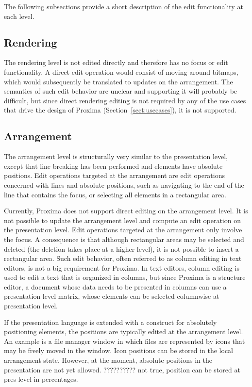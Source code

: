 The following subsections provide a short description of the edit functionality at each level. 
 
 
%																
\subsection{Rendering}

The rendering level is not edited directly and therefore has no focus or edit functionality. A direct edit operation would consist of moving around bitmaps, which would subsequently be translated to updates on the arrangement. The semantics of such edit behavior are unclear and supporting it will probably be difficult, but since direct rendering editing is not required by any of the use cases that drive the design of Proxima (Section~\ref{sect:usecases}), it is not supported.
  

%																
\subsection{Arrangement}\label{sect:editArr} 

The arrangement level is structurally very similar to the presentation level, except that line breaking has been performed and elements have absolute positions. Edit operations targeted at the arrangement are edit operations concerned with lines and absolute positions, such as navigating to the end of the line that contains the focus, or selecting all elements in a rectangular area.

Currently, Proxima does not support direct editing on the arrangement level. It is not possible to update the arrangement level and compute an edit operation on the presentation level. Edit operations targeted at the arrangement only involve the focus. A consequence is that although rectangular areas may be selected and deleted (the deletion takes place at a higher level), it is not possible to insert a rectangular area. Such edit behavior, often referred to as column editing in text editors, is not a big requirement for Proxima. In text editors, column editing is used to edit a text that is organized in columns, but since Proxima is a structure editor, a document whose data needs to be presented in columns can use a presentation level matrix, whose elements can be selected columnwise at presentation level.

\bc
If the presentation language is extended with a construct for absolutely positioning elements, the positions are typically edited at the arrangement level. An example is a  file manager window in which files are represented by icons that may be freely moved in  the window. Icon positions can be stored in the local arrangement state. However, at the  moment, absolute positions in the presentation are not yet allowed. 
?????????? not true, position can be stored at pres level in percentages.
\ec

